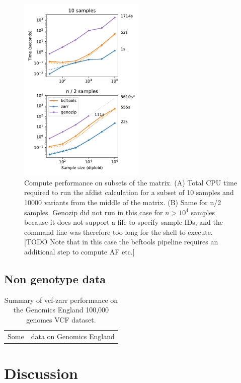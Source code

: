 \documentclass[a4paper,num-refs]{oup-contemporary}
\begin{document}
\begin{figure}
\includegraphics[width=6cm]{figures/subset-matrix-compute}
\caption{Compute performance on subsets of the matrix.
(A) Total CPU time required to run the afdist calculation for
a subset of 10 samples and 10000 variants from the middle of the matrix.
(B) Same for n/2 samples. Genozip did not run in this case for
$n > 10^4$ samples because it does not support a file to specify
sample IDs, and the command line was therefore too long for the shell
to execute. [TODO Note that in this case the bcftools pipeline requires
an additional step to compute AF etc.]
\label{fig-subset-matrix-compute}}
\end{figure}


\subsection{Non genotype data}

\begin{table}
\begin{tabular}{cc}
Some & data on Genomics England\\
\end{tabular}
\caption{Summary of vcf-zarr performance on the Genomics England 100,000
genomes VCF dataset.
\label{tab-genomics-england-data}}
\end{table}


\section{Discussion}
\end{document}
